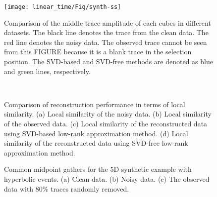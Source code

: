 \begin{figure}[htb!]
  \centering
  \texttt{[image: linear\_time/Fig/synth-ss]}
   \caption{Comparison of the middle trace amplitude of each cubes in different datasets. The black line denotes the trace from the clean data.  The red line denotes the noisy data. The observed trace cannot be seen from this FIGURE because it is a blank trace in the selection position. The SVD-based and SVD-free methods are denoted as blue and green lines, respectively.}
   \label{fig:synth-ss}
\end{figure}


\begin{figure}[htb!]
  \centering
   \\
   \caption{Comparison of reconstruction performance in terms of local similarity. (a) Local similarity of the noisy data. (b) Local similarity of the observed data. (c) Local similarity of the reconstructed data using SVD-based low-rank approximation method. (d) Local similarity of the reconstructed data using SVD-free low-rank approximation method.}
\label{fig:simi-syn5d-noisy-2d,simi-syn5d-decimated-2d,simi-syn5d-svd-2d,simi-syn5d-lmafit-2d}
\end{figure}


\begin{figure}[htb!]
  \centering
   \caption{Common midpoint gathers for the 5D synthetic example with hyperbolic events. (a) Clean data. (b) Noisy data. (c) The observed data with 80\% traces randomly removed.}
   \label{fig:curve5d-clean-3d-1,curve5d-noisy-3d-1,curve5d-decimated-3d-1}
\end{figure}




